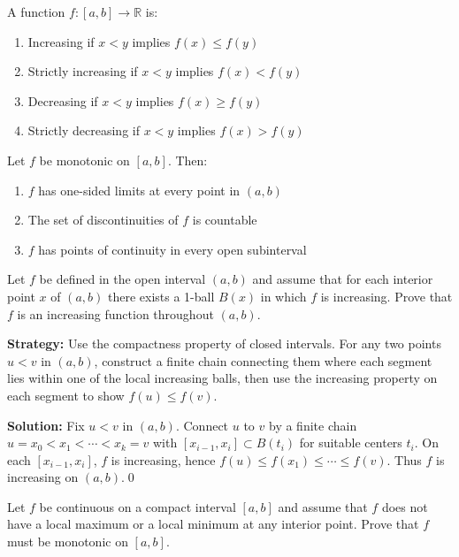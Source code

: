 \begin{definition}
A function $f: [a,b] \to \mathbb{R}$ is:
\begin{enumerate}
\item Increasing if $x < y$ implies $f(x) \leq f(y)$
\item Strictly increasing if $x < y$ implies $f(x) < f(y)$
\item Decreasing if $x < y$ implies $f(x) \geq f(y)$
\item Strictly decreasing if $x < y$ implies $f(x) > f(y)$
\end{enumerate}
\end{definition}

\begin{theorem}
Let $f$ be monotonic on $[a,b]$. Then:
\begin{enumerate}
\item $f$ has one-sided limits at every point in $(a,b)$
\item The set of discontinuities of $f$ is countable
\item $f$ has points of continuity in every open subinterval
\end{enumerate}
\end{theorem}



\begin{problembox}
Let $f$ be defined in the open interval $(a, b)$ and assume that for each interior point $x$ of $(a, b)$ there exists a 1-ball $B(x)$ in which $f$ is increasing. Prove that $f$ is an increasing function throughout $(a, b)$.
\end{problembox}

\noindent\textbf{Strategy:} Use the compactness property of closed intervals. For any two points $u < v$ in $(a,b)$, construct a finite chain connecting them where each segment lies within one of the local increasing balls, then use the increasing property on each segment to show $f(u) \leq f(v)$.

\bigskip\noindent\textbf{Solution:}
Fix $u<v$ in $(a,b)$. Connect $u$ to $v$ by a finite chain $u=x_0<x_1<\cdots<x_k=v$ with $[x_{i-1},x_i]\subset B(t_i)$ for suitable centers $t_i$. On each $[x_{i-1},x_i]$, $f$ is increasing, hence $f(u)\le f(x_1)\le\cdots\le f(v)$. Thus $f$ is increasing on $(a,b)$.\qed



\begin{problembox}
Let $f$ be continuous on a compact interval $[a, b]$ and assume that $f$ does not have a local maximum or a local minimum at any interior point. Prove that $f$ must be monotonic on $[a, b]$.
\end{problembox}

